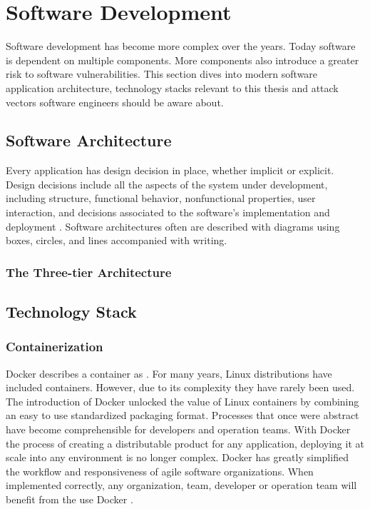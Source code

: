 \section{Software Development}
Software development has become more complex over the years. Today software is dependent on multiple components. More components also introduce a greater risk to software vulnerabilities. This section dives into modern software application architecture, technology stacks relevant to this thesis and attack vectors software engineers should be aware about.

\subsection{Software Architecture}
Every application has design decision in place, whether implicit or explicit. Design decisions include all the aspects of the system under development, including structure, functional behavior, nonfunctional properties, user interaction, and decisions associated to the software's implementation and deployment \cite{hasselbring2018software}. Software architectures often are described with diagrams using boxes, circles, and lines accompanied with writing.

\subsubsection{The Three-tier Architecture}

\subsection{Technology Stack}

\subsubsection{Containerization}
Docker describes a container as  \cite{docker_what_container}. For many years, Linux distributions have included containers. However, due to its complexity they have rarely been used. The introduction of Docker unlocked the value of Linux containers by combining an easy to use standardized packaging format. Processes that once were abstract have become comprehensible for developers and operation teams. With Docker the process of creating a distributable product for any application, deploying it at scale into any environment is no longer complex. Docker has greatly simplified the workflow and responsiveness of agile software organizations. When implemented correctly, any organization, team, developer or operation team will benefit from the use Docker \cite{matthias2015docker}.

